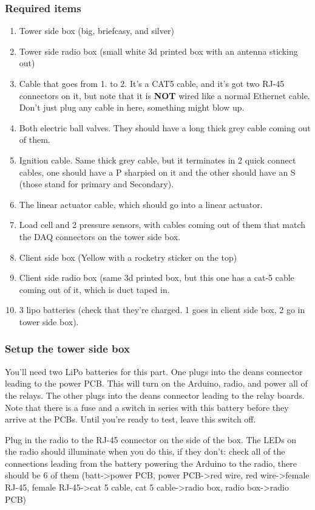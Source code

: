 \documentclass[11pt]{article}
\begin{document}
\subsubsection{Required items}
\label{sec:org543765a}
\begin{enumerate}
\item Tower side box (big, briefcasy, and silver)
\item Tower side radio box (small white 3d printed box with an antenna sticking
out)
\item Cable that goes from 1. to 2. It's a CAT5 cable, and it's got two RJ-45
connectors on it, but note that it is \textbf{NOT} wired like a normal Ethernet
cable. Don't just plug any cable in here, something might blow up.
\item Both electric ball valves. They should have a long thick grey cable coming
out of them.
\item Ignition cable. Same thick grey cable, but it terminates in 2 quick connect
cables, one should have a P sharpied on it and the other should have an S
(those stand for primary and Secondary).
\item The linear actuator cable, which should go into a linear actuator.
\item Load cell and 2 pressure sensors, with cables coming out of them that match
the DAQ connectors on the tower side box.
\item Client side box (Yellow with a rocketry sticker on the top)
\item Client side radio box (same 3d printed box, but this one has a cat-5 cable
coming out of it, which is duct taped in.
\item 3 lipo batteries (check that they're charged. 1 goes in client side box, 2 go
in tower side box).
\end{enumerate}

\subsubsection{Setup the tower side box}
\label{sec:org50cf548}
You'll need two LiPo batteries for this part. One plugs into the deans connector
leading to the power PCB. This will turn on the Arduino, radio, and power all of
the relays. The other plugs into the deans connector leading to the relay
boards. Note that there is a fuse and a switch in series with this battery
before they arrive at the PCBs. Until you're ready to test, leave this switch
off.

Plug in the radio to the RJ-45 connector on the side of the box. The LEDs on the
radio should illuminate when you do this, if they don't: check all of the
connections leading from the battery powering the Arduino to the radio, there
should be 6 of them (batt->power PCB, power PCB->red wire, red wire->female
RJ-45, female RJ-45->cat 5 cable, cat 5 cable->radio box, radio box->radio PCB)
\end{document}
